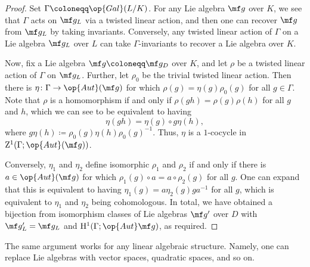 \documentclass[../notes.tex]{subfiles}
\begin{document}
\begin{proof}
	Set $\Gamma\coloneqq\op{Gal}(L/K)$. For any Lie algebra $\mf g$ over $K$, we see that $\Gamma$ acts on $\mf g_L$ via a twisted linear action, and then one can recover $\mf g$ from $\mf g_L$ by taking invariants. Conversely, any twisted linear action of $\Gamma$ on a Lie algebra $\mf g_L$ over $L$ can take $\Gamma$-invariants to recover a Lie algebra over $K$.

	Now, fix a Lie algebra $\mf g\coloneqq\mf g_D$ over $K$, and let $\rho$ be a twisted linear action of $\Gamma$ on $\mf g_L$. Further, let $\rho_0$ be the trivial twisted linear action. Then there is $\eta\colon\Gamma\to\op{Aut}(\mf g)$ for which $\rho(g)=\eta(g)\rho_0(g)$ for all $g\in\Gamma$. Note that $\rho$ is a homomorphism if and only if $\rho(gh)=\rho(g)\rho(h)$ for all $g$ and $h$, which we can see to be equivalent to having
	\[\eta(gh)=\eta(g)\circ g\eta(h),\]
	where $g\eta(h)\coloneqq\rho_0(g)\eta(h)\rho_0(g)^{-1}$. Thus, $\eta$ is a $1$-cocycle in $\mathrm Z^1(\Gamma;\op{Aut}(\mf g))$.
	
	Conversely, $\eta_1$ and $\eta_2$ define isomorphic $\rho_1$ and $\rho_2$ if and only if there is $a\in\op{Aut}(\mf g)$ for which $\rho_1(g)\circ a=a\circ\rho_2(g)$ for all $g$. One can expand that this is equivalent to having $\eta_1(g)=a\eta_2(g)ga^{-1}$ for all $g$, which is equivalent to $\eta_1$ and $\eta_2$ being cohomologous. In total, we have obtained a bijection from isomorphism classes of Lie algebras $\mf g'$ over $D$ with $\mf g'_L=\mf g_L$ and $\mathrm H^1(\Gamma;\op{Aut}\mf g)$, as required.
\end{proof}
\begin{remark}
	The same argument works for any linear algebraic structure. Namely, one can replace Lie algebras with vector spaces, quadratic spaces, and so on.
\end{remark}
\end{document}
